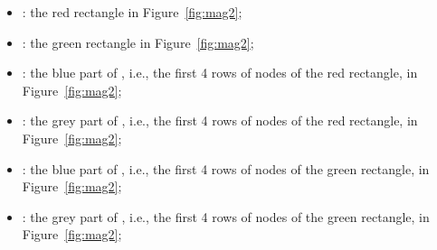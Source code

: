 \begin{itemize}
  \item {}: the red rectangle in Figure~\ref{fig:mag2};
  \item {}: the green rectangle in Figure~\ref{fig:mag2};
  \item {}: the blue part of , i.e., the first 4 rows
    of nodes of the red rectangle, in Figure~\ref{fig:mag2};
  \item {}: the grey part of , i.e., the first 4 rows
    of nodes of the red rectangle, in Figure~\ref{fig:mag2};
  \item {}: the blue part of , i.e., the first 4 rows
    of nodes of the green rectangle, in Figure~\ref{fig:mag2};
  \item {}: the grey part of , i.e., the first 4 rows
    of nodes of the green rectangle, in Figure~\ref{fig:mag2};
\end{itemize}






